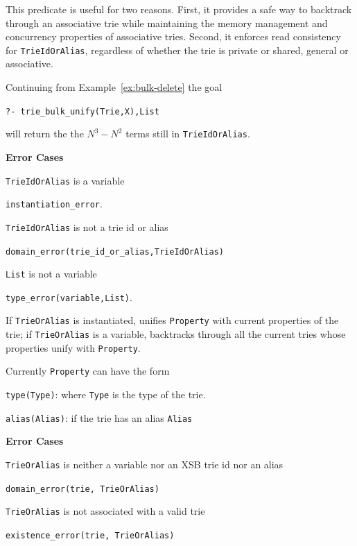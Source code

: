 \begin{description}
This predicate is useful for two reasons.  First, it provides a safe
way to backtrack through an associative trie while maintaining the
memory management and concurrency properties of associative tries.
Second, it enforces read consistency for {\tt TrieIdOrAlias},
regardless of whether the trie is private or shared, general or
associative.

\begin{example} \rm
Continuing from Example~\ref{ex:bulk-delete} the goal
\begin{center}
{\tt ?-  trie\_bulk\_unify(Trie,X),List} 
\end{center}
will return the the $N^3 - N^2$ terms still in {\tt TrieIdOrAlias}.
\end{example}

{\bf Error Cases}
\bi
\item 	{\tt TrieIdOrAlias} is a variable
\bi
\item 	{\tt instantiation\_error}.
\ei
\item 	{\tt TrieIdOrAlias} is not a trie id or alias
\bi
\item 	{\tt domain\_error(trie\_id\_or\_alias,TrieIdOrAlias)}
\ei
\item 	{\tt List} is not a variable
\bi
\item 	{\tt type\_error(variable,List)}.
\ei
\ei

%
If {\tt TrieOrAlias} is instantiated, unifies {\tt Property} with
current properties of the trie; if {\tt TrieOrAlias} is a variable,
backtracks through all the current tries whose properties unify with
{\tt Property}.

Currently {\tt Property} can have the form 
\bi
\item {\tt type(Type)}: where {\tt Type} is the type of the trie.
%
\item {\tt alias(Alias)}: if the trie has an alias {\tt Alias}
\ei

{\bf Error Cases}
%
\bi
\item {\tt TrieOrAlias} is neither a variable nor an XSB trie id
  nor an alias
\bi
\item {\tt domain\_error(trie, TrieOrAlias)}
\ei
\item {\tt TrieOrAlias} is not associated with a valid trie
\bi
\item {\tt existence\_error(trie, TrieOrAlias)}
\ei
\ei

%
\end{description}

